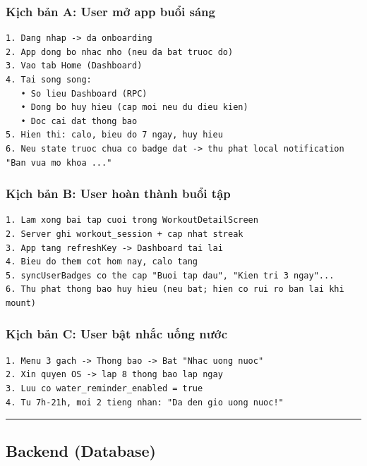 \documentclass[12pt,a4paper]{article}
\begin{document}
\subsubsection{Kịch bản A: User mở app buổi
sáng}\label{kux1ecbch-bux1ea3n-a-user-mux1edf-app-buux1ed5i-suxe1ng}

\begin{verbatim}
1. Dang nhap -> da onboarding
2. App dong bo nhac nho (neu da bat truoc do)
3. Vao tab Home (Dashboard)
4. Tai song song:
   • So lieu Dashboard (RPC)
   • Dong bo huy hieu (cap moi neu du dieu kien)
   • Doc cai dat thong bao
5. Hien thi: calo, bieu do 7 ngay, huy hieu
6. Neu state truoc chua co badge dat -> thu phat local notification "Ban vua mo khoa ..."
\end{verbatim}

\subsubsection{Kịch bản B: User hoàn thành buổi
tập}\label{kux1ecbch-bux1ea3n-b-user-houxe0n-thuxe0nh-buux1ed5i-tux1eadp}

\begin{verbatim}
1. Lam xong bai tap cuoi trong WorkoutDetailScreen
2. Server ghi workout_session + cap nhat streak
3. App tang refreshKey -> Dashboard tai lai
4. Bieu do them cot hom nay, calo tang
5. syncUserBadges co the cap "Buoi tap dau", "Kien tri 3 ngay"...
6. Thu phat thong bao huy hieu (neu bat; hien co rui ro ban lai khi mount)
\end{verbatim}

\subsubsection{Kịch bản C: User bật nhắc uống
nước}\label{kux1ecbch-bux1ea3n-c-user-bux1eadt-nhux1eafc-uux1ed1ng-nux1b0ux1edbc}

\begin{verbatim}
1. Menu 3 gach -> Thong bao -> Bat "Nhac uong nuoc"
2. Xin quyen OS -> lap 8 thong bao lap ngay
3. Luu co water_reminder_enabled = true
4. Tu 7h-21h, moi 2 tieng nhan: "Da den gio uong nuoc!"
\end{verbatim}

\begin{center}\rule{0.5\linewidth}{0.5pt}\end{center}

\subsection{Backend (Database)}\label{backend-database}
\end{document}
